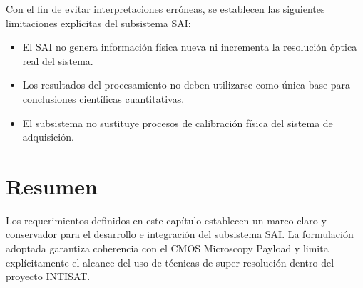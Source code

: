 Con el fin de evitar interpretaciones erróneas, se establecen las siguientes
limitaciones explícitas del subsistema SAI:

\begin{itemize}
    \item El SAI no genera información física nueva ni incrementa la resolución
    óptica real del sistema.
    \item Los resultados del procesamiento no deben utilizarse como única base
    para conclusiones científicas cuantitativas.
    \item El subsistema no sustituye procesos de calibración física del sistema
    de adquisición.
\end{itemize}

\section{Resumen}

Los requerimientos definidos en este capítulo establecen un marco claro y
conservador para el desarrollo e integración del subsistema SAI. La formulación
adoptada garantiza coherencia con el CMOS Microscopy Payload y limita
explícitamente el alcance del uso de técnicas de super-resolución dentro del
proyecto INTISAT.
